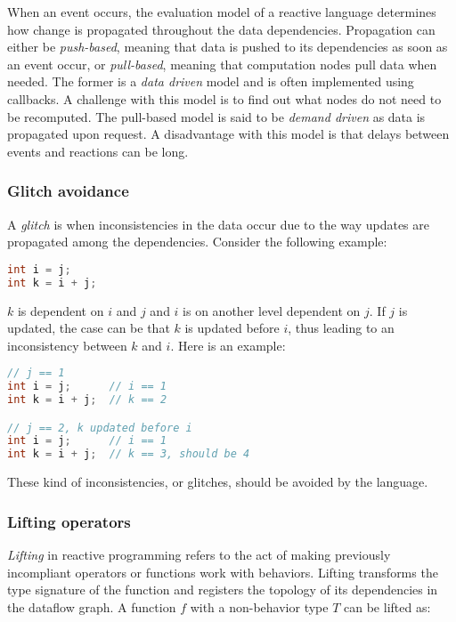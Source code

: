 When an event occurs, the evaluation model of a reactive language determines
how change is propagated throughout the data dependencies. Propagation can
either be \textit{push-based}, meaning that data is pushed to its dependencies
as soon as an event occur, or \textit{pull-based}, meaning that computation
nodes pull data when needed. The former is a \textit{data driven} model and is
often implemented using callbacks. A challenge with this model is to find out
what nodes do not need to be recomputed. The pull-based model is said to be
\textit{demand driven} as data is propagated upon request. A disadvantage with
this model is that delays between events and reactions can be long.

\subsubsection{Glitch avoidance}

A \textit{glitch} is when inconsistencies in the data occur due to the way
updates are propagated among the dependencies. Consider the following example:

\begin{lstlisting}[language=C]
int i = j;
int k = i + j;
\end{lstlisting}

$k$ is dependent on $i$ and $j$ and $i$ is on another level dependent on
$j$. If $j$ is updated, the case can be that $k$ is updated before $i$, thus
leading to an inconsistency between $k$ and $i$. Here is an example:


\begin{lstlisting}[language=C]
// j == 1
int i = j;      // i == 1
int k = i + j;  // k == 2

// j == 2, k updated before i
int i = j;      // i == 1
int k = i + j;  // k == 3, should be 4
\end{lstlisting}

These kind of inconsistencies, or glitches, should be avoided by the language.

\subsubsection{Lifting operators}

\textit{Lifting} in reactive programming refers to the act of making previously
incompliant operators or functions work with behaviors. Lifting transforms the
type signature of the function and registers the topology of its dependencies
in the dataflow graph. A function $f$ with a non-behavior type $T$ can be
lifted as:

